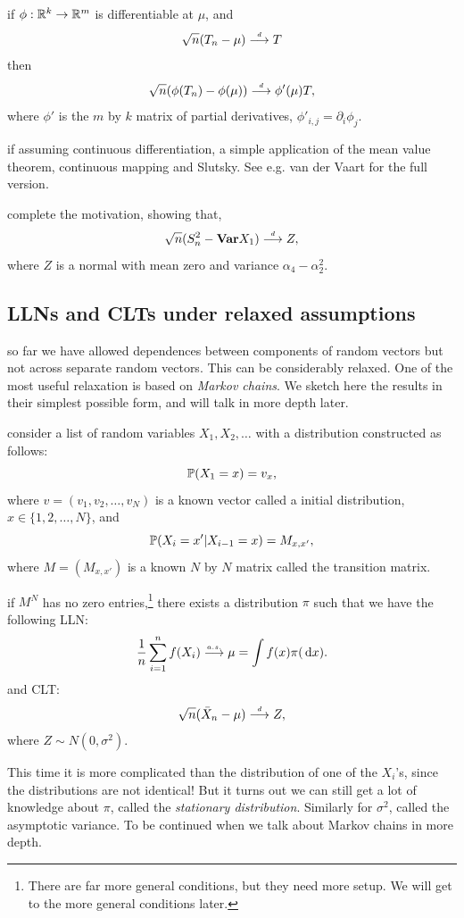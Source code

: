 \documentclass{article}
\begin{document}
 if $\phi : \R^k \to \R^m$ is differentiable at $\mu$, and 
\[ \sqrt{n}(T_n - \mu) \dcv T \] 
then
\[ \sqrt{n}(\phi(T_n) - \phi(\mu)) \dcv \phi'(\mu) T, \] 
where $\phi'$ is the $m$ by $k$ matrix of partial derivatives, $\phi'_{i,j}=\partial_i \phi_j$.

 if assuming continuous differentiation, a simple application of the mean value theorem, continuous mapping and Slutsky. See e.g. van der Vaart for the full version.

 complete the motivation, showing that, \[ \sqrt{n}(S^2_n - \var X_1) \dcv Z, \]
where $Z$ is a normal with mean zero and variance $\alpha_4 - \alpha_2^2$.


\subsection{LLNs and CLTs under relaxed assumptions}

 so far we have allowed dependences between components of random vectors but not across separate random vectors. This can be considerably relaxed. One of the most useful relaxation is based on \emph{Markov chains}. We sketch here the results in their simplest possible form, and will talk in more depth later.

 consider a list of random variables $X_1, X_2, \dots$ with a distribution constructed as follows:
\[ \P(X_1 = x) = v_x, \]
where $v = (v_1, v_2, \dots, v_N)$ is a known vector called a initial distribution, $x \in \{1, 2, \dots, N\}$, and
\[ \P(X_i = x' | X_{i-1} = x) = M_{x,x'}, \]
where $M = (M_{x,x'})$ is a known $N$ by $N$ matrix called the transition matrix. 

 if $M^N$ has no zero entries,\footnote{There are far more general conditions, but they need more setup. We will get to the more general conditions later.} there exists a distribution $\pi$ such that we have the following LLN:
\[ \frac{1}{n} \sum_{i=1}^n f(X_i) \ascv \mu = \int f(x) \pi(\ud x). \]
and CLT:
\[ \sqrt{n}(\bar X_n - \mu) \dcv Z, \]
where $Z \sim N(0, \sigma^2)$.

 This time it is more complicated than the distribution of one of the $X_i$'s, since the distributions are not identical! But it turns out we can still get a lot of knowledge about $\pi$, called the \emph{stationary distribution}. Similarly for $\sigma^2$, called the asymptotic variance. To be continued when we talk about Markov chains in more depth. 
\end{document}
